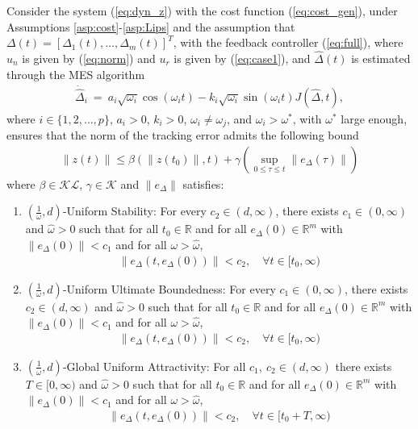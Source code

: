 \documentclass[twoside,leqno,onecolumn]{article}
\begin{document}
\begin{lemma}
Consider the system (\ref{eq:dyn_z}) with the cost function
(\ref{eq:cost_gen}), under Assumptions
\ref{asp:cost}-\ref{asp:Lips} and the assumption that $\Delta(t)
= [\Delta_1(t),\dots,\Delta_m(t)]^T$, with the feedback controller
(\ref{eq:full}), where $u_n$ is given by (\ref{eq:norm}) and $u_r$
is given by (\ref{eq:case1}), and $\widehat{\Delta}(t)$ is
estimated through the MES algorithm
\begin{align}
\label{eq:esa_gen} \dot{\widehat{\Delta}}_i~=~a_i\sqrt{\omega_i}
\cos(\omega_i t)- k_i \sqrt{\omega_i}\sin(\omega_i t)
J(\widehat{\Delta},t),
\end{align}
where $i\in\{1,2,\dots, p\}$, $a_i>0$, $k_i>0$,
$\omega_i\neq\omega_j$, and $\omega_i>\omega^*$, with $\omega^*$
large enough, ensures that the norm of the tracking error admits
the following bound
\begin{align*}
\|z(t)\|\leq \beta(\|z(t_0)\|,t) + \gamma(\sup_{0\leq\tau\leq t}
\|e_\Delta(\tau)\|)
\end{align*}
where $\beta\in\mathcal{KL}$, $\gamma\in\mathcal{K}$ and
$\|e_\Delta\|$ satisfies:
\begin{enumerate}
\item $(\frac{1}{\omega},d)$-Uniform Stability: For every
$c_2\in(d,\infty)$, there exists $c_1\in(0,\infty)$ and
$\hat{\omega}>0$ such that for all $t_0\in\mathbb{R}$ and for all
$e_\Delta(0)\in\mathbb{R}^m$ with $\|e_\Delta(0)\|<c_1$ and for
all $\omega>\hat{\omega}$,
\begin{align*}
\|e_\Delta(t,e_\Delta(0))\|<c_2, \quad \forall t\in[t_0,\infty)
\end{align*}
\item $(\frac{1}{\omega},d)$-Uniform Ultimate Boundedness: For
every $c_1\in(0,\infty)$, there exists $c_2\in(d,\infty)$ and
$\hat{\omega}>0$ such that for all $t_0\in \mathbb{R}$ and for all
$e_\Delta(0)\in\mathbb{R}^m$ with $\|e_\Delta(0)\|<c_1$ and for
all $\omega>\hat{\omega}$,
\begin{align*}
\|e_\Delta(t,e_\Delta(0))\|<c_2, \quad \forall t\in[t_0,\infty)
\end{align*}
\item $(\frac{1}{\omega},d)$-Global Uniform Attractivity: For all
$c_1,~c_2 \in(d,\infty)$ there exists $T\in[0,\infty)$ and
$\hat{\omega}>0$ such that for all $t_0\in\mathbb{R}$ and for all
$e_\Delta(0)\in\mathbb{R}^m$ with $\|e_\Delta(0)\|<c_1$ and for
all $\omega>\hat{\omega}$,
\begin{align*}
\|e_\Delta(t,e_\Delta(0))\|<c_2, \quad \forall t\in[t_0+T,\infty)
\end{align*}
\end{enumerate}
\end{lemma}
\end{document}

